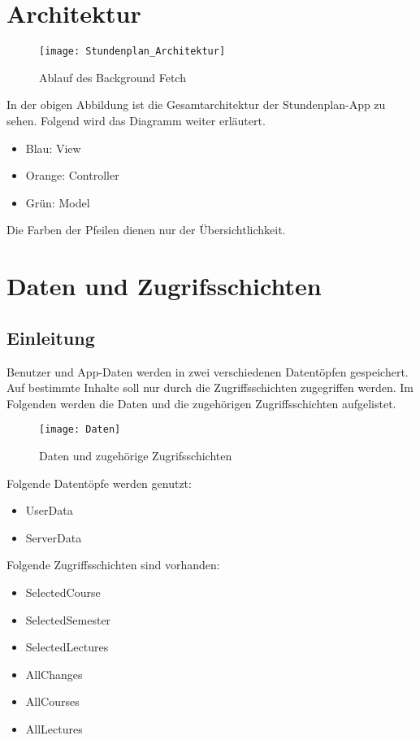 \chapter{Architektur}

\begin{figure}[htb]
    \centering
    \texttt{[image: Stundenplan\_Architektur]}
    \caption{Ablauf des Background Fetch}
\end{figure}

In der obigen Abbildung ist die Gesamtarchitektur der Stundenplan-App zu sehen. Folgend wird das Diagramm weiter erläutert. \\

\begin{itemize}
     \item Blau: View
     \item Orange: Controller
     \item Grün: Model\\
\end{itemize}

Die Farben der Pfeilen dienen nur der Übersichtlichkeit.

\chapter{Daten und Zugrifsschichten}
\section{Einleitung}
Benutzer und App-Daten werden in zwei verschiedenen Datentöpfen gespeichert. Auf bestimmte Inhalte soll nur durch die Zugriffsschichten zugegriffen werden. Im Folgenden werden die Daten und die zugehörigen Zugriffsschichten aufgelistet.\\

\begin{figure}[htb]
    \centering
    \texttt{[image: Daten]}
    \caption{Daten und zugehörige Zugrifsschichten}
\end{figure}
\newpage

Folgende Datentöpfe werden genutzt:
\begin{itemize}
     \item UserData
     \item ServerData \\
\end{itemize}

Folgende Zugriffsschichten sind vorhanden:
\begin{itemize}
     \item SelectedCourse
     \item SelectedSemester
     \item SelectedLectures
     \item AllChanges
     \item AllCourses
     \item AllLectures
\end{itemize}

